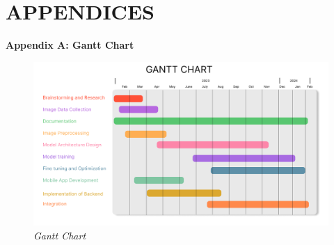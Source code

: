 \section{APPENDICES}
\textbf{Appendix A: Gantt Chart }
\begin{figure}[h]
    \centering
    \includegraphics[width= 6.5in ]{img/Gantt Chart Improved.png}
    \caption{\textit{Gantt Chart}}
\end{figure}
